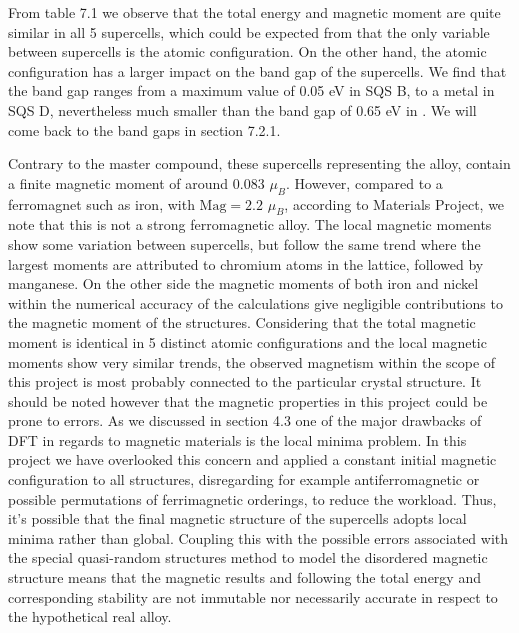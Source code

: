 From table 7.1 we observe that the total energy and magnetic moment are quite similar in all 5 supercells, which could be expected from that the only variable between supercells is the atomic configuration. On the other hand, the atomic configuration has a larger impact on the band gap of the supercells. We find that the band gap ranges from a maximum value of 0.05 eV in SQS B, to a metal in SQS D, nevertheless much smaller than the band gap of 0.65 eV in . We will come back to the band gaps in section 7.2.1. 

Contrary to the master compound, these supercells representing the  alloy, contain a finite magnetic moment of around $0.083$  $\mu_B$. However, compared to a ferromagnet such as iron, with $\text{Mag} = 2.2$  $\mu_B$, according to Materials Project, we note that this is not a strong ferromagnetic alloy. The local magnetic moments show some variation between supercells, but follow the same trend where the largest moments are attributed to chromium atoms in the lattice, followed by manganese. On the other side the magnetic moments of both iron and nickel within the numerical accuracy of the calculations give negligible contributions to the magnetic moment of the structures. Considering that the total magnetic moment is identical in 5 distinct atomic configurations and the local magnetic moments show very similar trends, the observed magnetism within the scope of this project is most probably connected to the particular crystal structure. It should be noted however that the magnetic properties in this project could be prone to errors. As we discussed in section 4.3 one of the major drawbacks of DFT in regards to magnetic materials is the local minima problem. In this project we have overlooked this concern and applied a constant initial magnetic configuration to all structures, disregarding for example antiferromagnetic or possible permutations of ferrimagnetic orderings, to reduce the workload. Thus, it's possible that the final magnetic structure of the supercells adopts local minima rather than global. Coupling this with the possible errors associated with the special quasi-random structures method to model the disordered magnetic structure means that the magnetic results and following the total energy and corresponding stability are not immutable nor necessarily accurate in respect to the hypothetical real alloy. 
    
